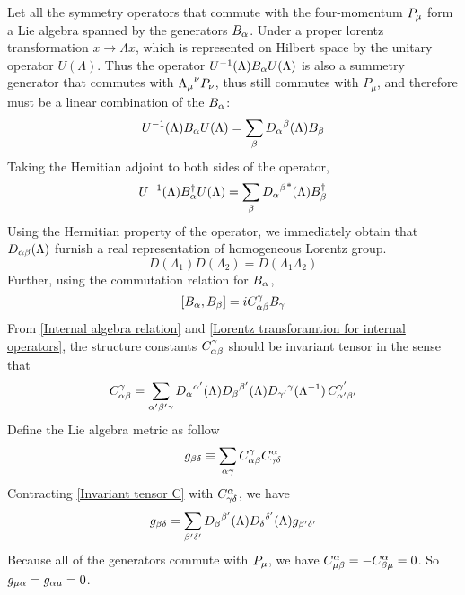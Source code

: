     Let all the symmetry operators that commute with the four-momentum $P_\mu$ form a Lie algebra spanned by the generators $B_\alpha$. Under a proper lorentz transformation $x\rightarrow \Lambda x$, which is represented on Hilbert space by the unitary operator $U(\Lambda)$. Thus the operator $U^{-1}(\Lambda)B_\alpha U(\Lambda)$ is also a summetry generator that commutes with ${\Lambda_\mu}^\nu P_\nu$, thus still commutes with $P_\mu$, and therefore must be a linear combination of the $B_\alpha$:
    \begin{equation}\label{Lorentz transforamtion for internal operators}
      U^{-1}(\Lambda) B_\alpha U(\Lambda) 
      =\sum_{\beta}{D_{\alpha}}^{\beta}(\Lambda)B_\beta
    \end{equation}  
    Taking the Hemitian adjoint to both sides of the operator, 
    \begin{equation}
     U^{-1}(\Lambda)B_\alpha^{\dagger}U(\Lambda)
     =\sum_{\beta}{{D_{\alpha}}^{\beta}}^{*}(\Lambda)B^{\dagger}_{\beta}
    \end{equation}
    Using the Hermitian property of the operator, we immediately obtain that $D_{\alpha\beta}(\Lambda)$ furnish a real representation of homogeneous Lorentz group.
    \begin{equation}\label{representation of lorentz group}
    D(\Lambda_1)D(\Lambda_2) = D(\Lambda_1\Lambda_2)
    \end{equation}
    Further, using the commutation relation for $B_\alpha$,
    \begin{equation}\label{Internal algebra relation}
    \comm{B_\a}{B_\be} = i C^{\g}_{\a\be}B_{\g}
    \end{equation}     
    From \eqref{Internal algebra relation} and \eqref{Lorentz transforamtion for internal operators}, the structure constants $C^{\gamma}_{\alpha\beta}$ should be invariant tensor in the sense that 
    \begin{equation}\label{Invariant tensor C}
    C^{\gamma}_{\alpha\beta}=
    \sum_{\alpha'\beta'\gamma}
    {D_\alpha}^{\alpha'}(\Lambda){D_\beta}^{\beta'}
    (\Lambda)
    {D_{\gamma'}}^{\gamma}(\Lambda^{-1})\,C^{\gamma'}_{\alpha'\beta'}
    \end{equation}
    Define the Lie algebra metric as follow
    \begin{equation}\label{definition of lie algebra metric}
    g_{\beta\delta}
    \equiv
    \sum_{\alpha\gamma}
    C^{\gamma}_{\alpha\beta}C^{\alpha}_{\gamma\delta}
    \end{equation}  
    Contracting \eqref{Invariant tensor C} with $C^{\alpha}_{\gamma\delta}$, we have
    \begin{equation}\label{property of lie algebra matrix}
    g_{\beta\delta} = \sum_{\beta'\delta'}
    {D_{\beta}}^{\beta'}(\Lambda)
    {D_{\delta}}^{\delta'}(\Lambda)
    g_{\beta'\delta'}
    \end{equation}
    Because all of the generators commute with $P_\mu$, we have $C^{\alpha}_{\mu\beta} = -C^{\alpha}_{\beta\mu} = 0$. So $g_{\mu\alpha}=g_{\alpha\mu} = 0$.
    
